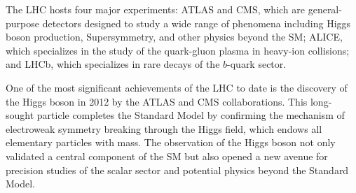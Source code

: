 The LHC hosts four major experiments: ATLAS and CMS, which are general-purpose detectors designed to study a wide range of phenomena including Higgs boson production, Supersymmetry, and other physics beyond the SM; ALICE, which specializes in the study of the quark-gluon plasma in heavy-ion collisions; and LHCb, which specializes in rare decays of the $b$-quark sector.

One of the most significant achievements of the LHC to date is the discovery of the Higgs boson in 2012 by the ATLAS and CMS collaborations. This long-sought particle completes the Standard Model by confirming the mechanism of electroweak symmetry breaking through the Higgs field, which endows all elementary particles with mass. The observation of the Higgs boson not only validated a central component of the SM but also opened a new avenue for precision studies of the scalar sector and potential physics beyond the Standard Model.
